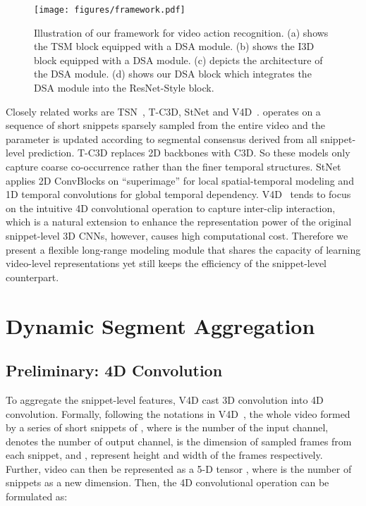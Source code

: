 \documentclass[sigconf]{acmart}
\begin{document}
\begin{figure*}[t]
    \centering
    \texttt{[image: figures/framework.pdf]}
    \caption{Illustration of our framework for video action recognition. (a) shows the TSM block equipped with a DSA module. (b) shows the I3D block equipped with a DSA module. (c) depicts the architecture of the DSA module. (d) shows our DSA block which integrates the DSA module into the ResNet-Style block.}
    \label{fig:dsa}
\end{figure*} 

Closely related works are TSN~\cite{tsn}, T-C3D\cite{tc3d}, StNet\cite{he2019stnet} and V4D~\cite{zhang2020v4d}.
\cite{tsn} operates on a sequence of short snippets sparsely sampled from the entire video and the parameter is updated according to segmental consensus derived from all snippet-level prediction. T-C3D replaces 2D backbones with C3D. So these models only capture coarse co-occurrence rather than the finer temporal structures. StNet applies 2D ConvBlocks on ``superimage'' for local spatial-temporal modeling and 1D temporal convolutions for global temporal dependency. V4D~\cite{zhang2020v4d} tends to focus on the intuitive 4D convolutional operation to capture inter-clip interaction, which is a natural extension to enhance the representation power of the original snippet-level 3D CNNs, however, causes high computational cost.
Therefore we present a flexible long-range modeling module that shares the capacity of learning video-level representations yet still keeps the efficiency of the snippet-level counterpart.








\section{Dynamic Segment Aggregation}


\subsection{Preliminary: 4D Convolution}
To aggregate the snippet-level features, V4D cast 3D convolution into 4D convolution. Formally, following the notations in V4D~\cite{zhang2020v4d}, the whole video formed by a series of short snippets of , where  is the number of the input channel,  denotes the number of output channel,  is the dimension of sampled frames from each snippet, and ,  represent height and width of the frames respectively.
Further, video can then be represented as a 5-D tensor , where  is the number of snippets as a new dimension. Then, the 4D convolutional operation can be formulated as:
\end{document}

